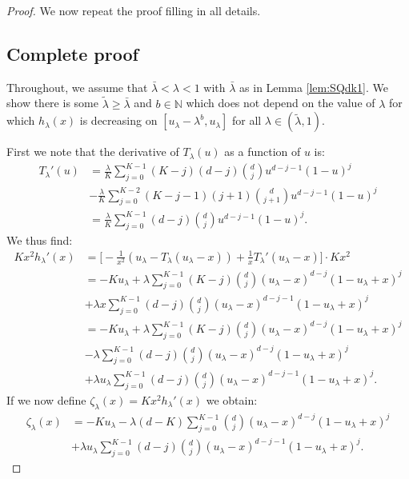 \documentclass[12pt]{report}
\begin{document}
\begin{proof}
We now repeat the proof filling in all details.
\subsection*{Complete proof}

Throughout, we assume that $\bar \lambda < \lambda < 1$ with $\bar \lambda$ as in Lemma \ref{lem:SQdk1}. We show there is some $\tilde{\lambda} \geq \bar \lambda$ and $b \in \mathbb{N}$ which does not depend on the value of $\lambda$ for which $h_{\lambda}(x)$ is decreasing on $[u_\lambda - \lambda^b, u_{\lambda}]$ for all $\lambda \in (\tilde \lambda, 1)$.

First we note that the derivative of $T_\lambda(u)$ as a function of $u$ is:
\begin{align*}
T_\lambda'(u)
&=\frac{\lambda}{K} \sum_{j=0}^{K-1} (K-j) (d-j) \binom{d}{j} u^{d-j-1} (1-u)^j \\
&-\frac{\lambda}{K} \sum_{j=0}^{K-2} (K-j-1) (j+1) \binom{d}{j+1} u^{d-j-1} (1-u)^j\\
&= \frac{\lambda}{K} \sum_{j=0}^{K-1} (d-j) \binom{d}{j} u^{d-j-1} (1-u)^j.
\end{align*}
We thus find:
\begin{align*}
Kx^2 h_\lambda'(x)
&= \bigg[ -\frac{1}{x^2} (u_\lambda - T_\lambda(u_\lambda - x)) + \frac{1}{x} T_\lambda'(u_\lambda - x) \bigg] \cdot K x^2\\
&=-Ku_\lambda + \lambda \sum_{j=0}^{K-1} (K-j) \binom{d}{j} (u_\lambda-x)^{d-j} (1-u_\lambda+x)^j\\
&+\lambda x \sum_{j=0}^{K-1} (d-j) \binom{d}{j} (u_\lambda - x)^{d-j-1} (1-u_\lambda + x)^j\\
&=-K u_\lambda + \lambda\sum_{j=0}^{K-1} (K-j) \binom{d}{j} (u_\lambda - x)^{d-j} (1-u_\lambda+x)^j\\
&-\lambda\sum_{j=0}^{K-1} (d-j) \binom{d}{j} (u_\lambda - x)^{d-j} (1-u_\lambda + x)^j\\
&+\lambda u_\lambda \sum_{j=0}^{K-1} (d-j) \binom{d}{j} (u_\lambda - x)^{d-j-1} (1-u_\lambda+x)^j.
\end{align*}
If we now define $\zeta_\lambda(x)=Kx^2h_\lambda'(x)$ we obtain:
\begin{align}
\zeta_\lambda(x)
&=
-K u_\lambda - \lambda (d-K) \sum_{j=0}^{K-1} \binom{d}{j} (u_\lambda - x)^{d-j} (1-u_\lambda+x)^j\nonumber\\
&+ \lambda u_\lambda \sum_{j=0}^{K-1} (d-j) \binom{d}{j} (u_\lambda-x)^{d-j-1} (1-u_\lambda+x)^j.\label{eq:zetalamx}
\end{align}

\end{proof}
\end{document}
